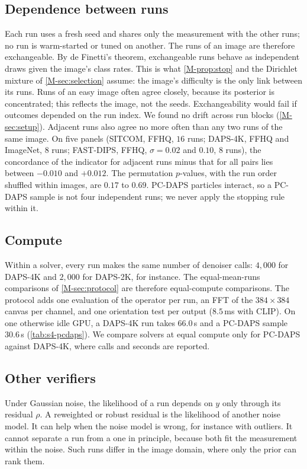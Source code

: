 \subsection{Dependence between runs}
\label{sec:suppl-dependence}
Each run uses a fresh seed and shares only the measurement with the other runs; no run is warm-started or tuned on another.
The runs of an image are therefore exchangeable.
By de Finetti's theorem, exchangeable runs behave as independent draws given the image's class rates.
This is what \cref{M-prop:stop} and the Dirichlet mixture of \cref{M-sec:selection} assume: the image's difficulty is the only link between its runs.
Runs of an easy image often agree closely, because its posterior is concentrated; this reflects the image, not the seeds.
Exchangeability would fail if outcomes depended on the run index.
We found no drift across run blocks (\cref{M-sec:setup}).
Adjacent runs also agree no more often than any two runs of the same image.
On five panels (SITCOM, FFHQ, $16$ runs; DAPS-4K, FFHQ and ImageNet, $8$ runs; FAST-DIPS, FFHQ, $\sigma=0.02$ and $0.10$, $8$ runs), the concordance of the \good indicator for adjacent runs minus that for all pairs lies between $-0.010$ and $+0.012$.
The permutation $p$-values, with the run order shuffled within images, are $0.17$ to $0.69$.
PC-DAPS particles interact, so a PC-DAPS sample is not four independent runs; we never apply the stopping rule within it.

\subsection{Compute}
\label{sec:suppl-compute}
Within a solver, every run makes the same number of denoiser calls: $4{,}000$ for DAPS-4K and $2{,}000$ for DAPS-2K, for instance.
The equal-mean-runs comparisons of \cref{M-sec:protocol} are therefore equal-compute comparisons.
The protocol adds one evaluation of the operator per run, an FFT of the $384\times384$ canvas per channel, and one orientation test per output ($8.5$\,ms with CLIP).
On one otherwise idle GPU, a DAPS-4K run takes $66.0$\,s and a PC-DAPS sample $30.6$\,s (\cref{tab:s4-pcdaps}).
We compare solvers at equal compute only for PC-DAPS against DAPS-4K, where calls and seconds are reported.

\subsection{Other verifiers}
\label{sec:suppl-verifiers}
Under Gaussian noise, the likelihood of a run depends on $y$ only through its residual $\rho$.
A reweighted or robust residual is the likelihood of another noise model.
It can help when the noise model is wrong, for instance with outliers.
It cannot separate a \cons run from a \good one in principle, because both fit the measurement within the noise.
Such runs differ in the image domain, where only the prior can rank them.

